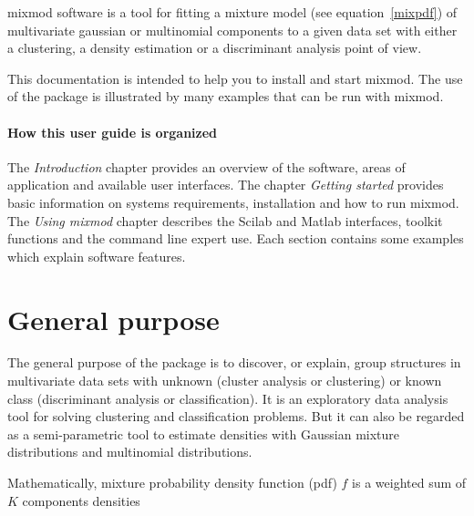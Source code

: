 {\sc mixmod} software is a tool for fitting a mixture
model (see equation~\ref{mixpdf}) of multivariate gaussian or multinomial components to a
given data set with either a clustering, a density estimation or a
discriminant analysis point of view.

This documentation is intended to help you to
install and start {\sc mixmod}. The use of the
package is illustrated by many examples that can be run with {\sc mixmod}.

\paragraph*{How this user guide is organized\\}

The {\em Introduction} chapter provides an overview of the software, areas of
application and available user interfaces.
The chapter {\em Getting started} provides basic information on systems requirements, installation and how
to run {\sc mixmod}.
The {\em Using {\sc mixmod}} chapter describes the Scilab and Matlab interfaces, toolkit functions and the
command line expert use. Each section contains some examples which explain software features.

\section{General purpose}


The general purpose of the package is to discover, or explain, group
structures in multivariate data sets with unknown (cluster
analysis or clustering) or known class (discriminant analysis or classification). It is an exploratory
data analysis tool for solving clustering and classification
problems. But it can also be regarded as a semi-parametric tool to
estimate densities with Gaussian mixture distributions and multinomial distributions.

Mathematically, mixture probability density function (pdf) $f$ is a
weighted sum of $K$ components densities


